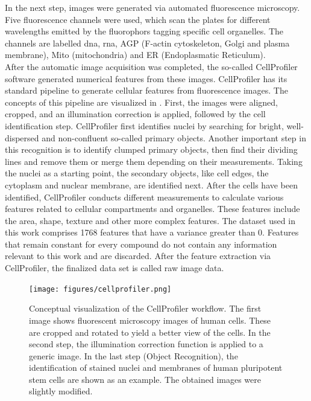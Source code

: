 In the next step, images were generated via automated fluorescence microscopy. Five fluorescence channels were used, which scan the plates for different wavelengths emitted by the fluorophors tagging specific cell organelles. The channels are labelled \ac{dna}, \ac{rna}, AGP (F-actin cytoskeleton, Golgi and plasma membrane), Mito (mitochondria) and ER (Endoplasmatic Reticulum).\cite{Bray2017}\\
After the automatic image acquisition was completed, the so-called CellProfiler\cite{Carpenter2006,Kamentsky2011} software generated numerical features from these images. CellProfiler has its standard pipeline to generate cellular features from fluorescence images. The concepts of this pipeline are visualized in . First, the images were aligned, cropped, and an illumination correction is applied, followed by the cell identification step. CellProfiler first identifies nuclei by searching for bright, well-dispersed and non-confluent so-called primary objects. Another important step in this recognition is to identify clumped primary objects, then find their dividing lines and remove them or merge them depending on their measurements.\cite{Carpenter2006} Taking the nuclei as a starting point, the secondary objects, like cell edges, the cytoplasm and nuclear membrane, are identified next. After the cells have been identified, CellProfiler conducts different measurements to calculate various features related to cellular compartments and organelles. These features include the area, shape, texture and other more complex features.\cite{Carpenter2006} The dataset used in this work comprises 1768 features that have a variance greater than 0. Features that remain constant for every compound do not contain any information relevant to this work and are discarded. After the feature extraction via CellProfiler, the finalized data set is called raw image data. 
\begin{figure}[H]
	\centering
	\texttt{[image: figures/cellprofiler.png]}
	\caption[CellProfiler Workflow]{Conceptual visualization of the CellProfiler workflow. The first image shows fluorescent microscopy images of human cells. These are cropped and rotated to yield a better view of the cells.\cite{Moffat2006}\cite{cellprofiler2021} In the second step, the illumination correction function is applied to a generic image.\cite{cellprofiler2021} In the last step (Object Recognition), the identification of stained nuclei and membranes of human pluripotent stem cells are shown as an example.\cite{McQuin2018} The obtained images were slightly modified.}
	\label{fig:cellprofiler}
\end{figure}\noindent
%
%

